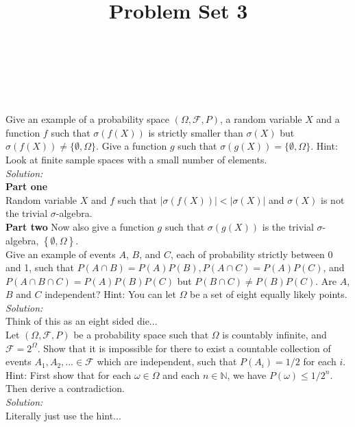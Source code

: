 \documentclass[10pt]{amsart}
\begin{document}
\noindent
{} \\
 \\
 \\
\title{Problem Set 3}
\maketitle

 Give an example of a probability space $(\Omega, \mathcal{F},P)$, a random variable $X$ and a function $f$ such that $\sigma(f(X))$ is strictly smaller than $\sigma(X)$ but $\sigma(f(X)) \neq \{\emptyset,\Omega\}$. Give a function $g$ such that $\sigma(g(X))=\{\emptyset,\Omega\}$. Hint: Look at finite sample spaces with a small number of elements. \\
\textit{Solution:} \\
\textbf{Part one} \\
Random variable $X$ and $f$ such that $\left|\sigma(f(X)) \right| < \left| \sigma(X) \right|$ and $\sigma(X)$ is not the trivial $\sigma$-algebra. \\
\textbf{Part two}
Now also give a function $g$ such that $\sigma(g(X))$ is the trivial $\sigma$-algebra, $\left\{ \emptyset, \Omega\right\}$.
\\

 Give an example of events $A$, $B$, and $C$, each of probability strictly between 0 and 1, such that
$P(A\cap B)=P(A)P(B), P(A\cap C)=P(A)P(C)$, and $P(A\cap B\cap C)=P(A)P(B)P(C)$ but $P(B\cap C)\neq P(B)P(C)$. Are $A$, $B$ and $C$ independent? Hint: You can let $\Omega$ be a set of eight equally likely points. \\
\textit{Solution:} \\
Think of this as an eight sided die...
\\

 Let $(\Omega, \mathcal{F},P)$ be a probability space such that $\Omega$ is countably infinite, and $\mathcal{F}=2^{\Omega}$. Show that it is impossible for there to exist a countable collection of events $A_1, A_2,... \in \mathcal{F}$ which are independent, such that $P(A_i)=1/2$ for each $i$. Hint: First show that for each $\omega \in \Omega$ and each $n\in \mathds{N}$, we have $P({\omega})\leq 1/2^n$. Then derive a contradiction. \\
\textit{Solution:} \\
Literally just use the hint...
\\
\end{document}
